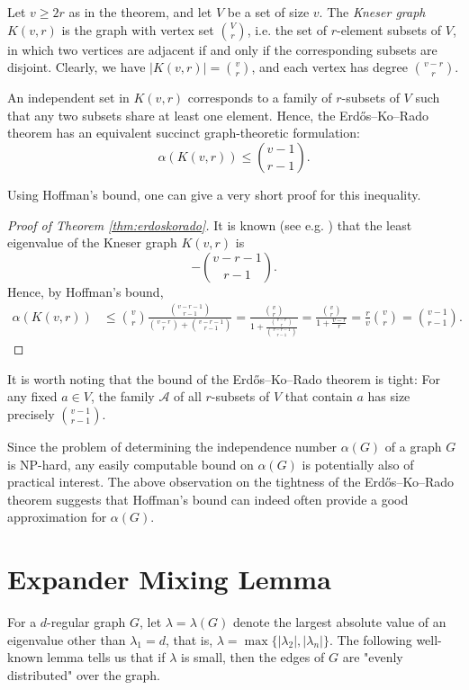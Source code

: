Let $v \ge 2r$ as in the theorem, and let $V$ be a set of size $v$.
The \textit{Kneser graph} $K(v, r)$ is the graph with vertex set $\binom{V}{r}$, i.e. the set of $r$-element subsets of $V$, in which two vertices are adjacent if and only if the corresponding subsets are disjoint.
Clearly, we have $|K(v, r)| = \binom{v}{r}$, and each vertex has degree $\binom{v - r}{r}$.

An independent set in $K(v, r)$ corresponds to a family of $r$-subsets of $V$ such that any two subsets share at least one element. 
Hence, the Erd\H os--Ko--Rado theorem has an equivalent succinct graph-theoretic formulation: 
\begin{equation*}
    \alpha(K(v, r)) \le \binom{v - 1}{r - 1}.
\end{equation*}

Using Hoffman's bound, one can give a very short proof for this inequality.
\begin{proof}[Proof of Theorem \ref{thm:erdoskorado}]
    It is known (see e.g. \cite[Section 9.4]{godsilroyle}) that the least eigenvalue of the Kneser graph $K(v, r)$ is 
    \begin{equation*}
        - \binom{v - r - 1}{r - 1}.
    \end{equation*}
    Hence, by Hoffman's bound, 
    \begin{align*}
        \alpha(K(v, r)) &\le \binom{v}{r} \frac{\binom{v - r - 1}{r - 1}}{\binom{v - r}{r} + \binom{v - r - 1}{r - 1}} 
            = \frac{\binom{v}{r}}{1 + \frac{\binom{v - r}{r}}{\binom{v - r - 1}{r - 1}}} 
            = \frac{\binom{v }{r}}{1 + \frac{v - r}{r}}
            = \frac{r}{v} \binom{v}{r} = \binom{v - 1}{r - 1}.
    \end{align*}
\end{proof}

It is worth noting that the bound of the Erd\H os--Ko--Rado theorem is tight:
For any fixed $a \in V$, the family $\mathcal A$ of all $r$-subsets of $V$ that contain $a$ has size precisely $\binom{v - 1}{r - 1}$.

Since the problem of determining the independence number $\alpha(G)$ of a graph $G$ is NP-hard, any easily computable bound on $\alpha(G)$ is potentially also of practical interest. 
The above observation on the tightness of the Erd\H os--Ko--Rado theorem suggests that Hoffman's bound can indeed often provide a good approximation for $\alpha(G)$.

\section{Expander Mixing Lemma}
For a $d$-regular graph $G$, let $\lambda = \lambda(G)$ denote the largest absolute value of an eigenvalue other than $\lambda_1 = d$, that is, $\lambda = \max \{ |\lambda_2|, |\lambda_n| \}$.
The following well-known lemma tells us that if $\lambda$ is small, then the edges of $G$ are "evenly distributed" over the graph.

